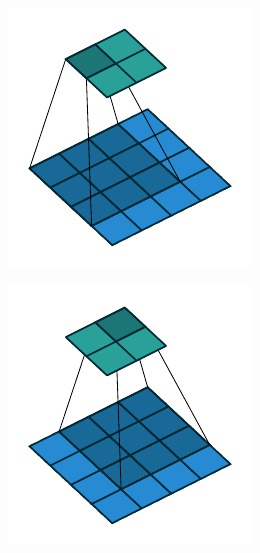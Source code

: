 \begin{figure}[H]
    \centering
    \begin{subfigure}{0.22\linewidth}
        \centering
        \includegraphics[width=\linewidth]{figures/convolutions/no_padding_no_strides_00.pdf}
    \end{subfigure}\hfill%
    \begin{subfigure}{0.22\linewidth}
        \centering
        \includegraphics[width=\linewidth]{figures/convolutions/no_padding_no_strides_01.pdf}

\end{subfigure}
\end{figure}
